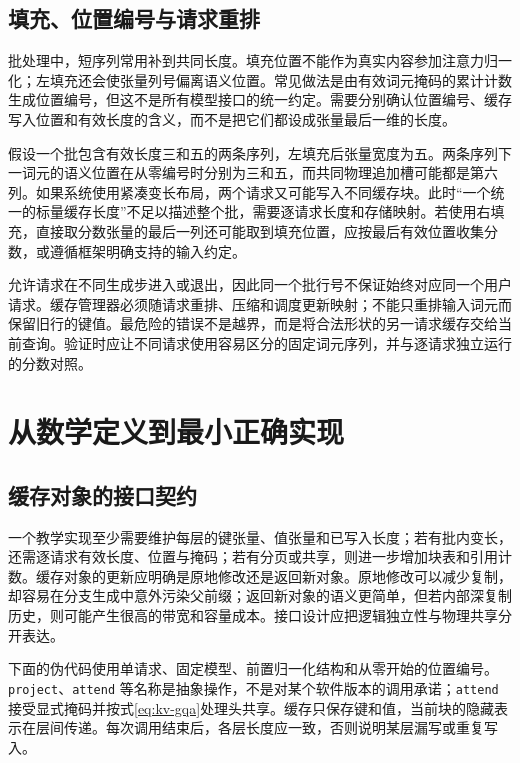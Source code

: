 \documentclass[UTF8,12pt,a4paper,fontset=fandol]{ctexart}
\begin{document}
\subsection{填充、位置编号与请求重排}

批处理中，短序列常用补到共同长度。填充位置不能作为真实内容参加注意力归一化；左填充还会使张量列号偏离语义位置。常见做法是由有效词元掩码的累计计数生成位置编号，但这不是所有模型接口的统一约定。需要分别确认位置编号、缓存写入位置和有效长度的含义，而不是把它们都设成张量最后一维的长度。

假设一个批包含有效长度三和五的两条序列，左填充后张量宽度为五。两条序列下一词元的语义位置在从零编号时分别为三和五，而共同物理追加槽可能都是第六列。如果系统使用紧凑变长布局，两个请求又可能写入不同缓存块。此时“一个统一的标量缓存长度”不足以描述整个批，需要逐请求长度和存储映射。若使用右填充，直接取分数张量的最后一列还可能取到填充位置，应按最后有效位置收集分数，或遵循框架明确支持的输入约定。

允许请求在不同生成步进入或退出，因此同一个批行号不保证始终对应同一个用户请求。缓存管理器必须随请求重排、压缩和调度更新映射；不能只重排输入词元而保留旧行的键值。最危险的错误不是越界，而是将合法形状的另一请求缓存交给当前查询。验证时应让不同请求使用容易区分的固定词元序列，并与逐请求独立运行的分数对照。

\section{从数学定义到最小正确实现}
\label{sec:kv-implementation}

\subsection{缓存对象的接口契约}

一个教学实现至少需要维护每层的键张量、值张量和已写入长度；若有批内变长，还需逐请求有效长度、位置与掩码；若有分页或共享，则进一步增加块表和引用计数。缓存对象的更新应明确是原地修改还是返回新对象。原地修改可以减少复制，却容易在分支生成中意外污染父前缀；返回新对象的语义更简单，但若内部深复制历史，则可能产生很高的带宽和容量成本。接口设计应把逻辑独立性与物理共享分开表达。

下面的伪代码使用单请求、固定模型、前置归一化结构和从零开始的位置编号。\texttt{project}、\texttt{attend} 等名称是抽象操作，不是对某个软件版本的调用承诺；\texttt{attend} 接受显式掩码并按式\eqref{eq:kv-gqa}处理头共享。缓存只保存键和值，当前块的隐藏表示在层间传递。每次调用结束后，各层长度应一致，否则说明某层漏写或重复写入。
\end{document}
